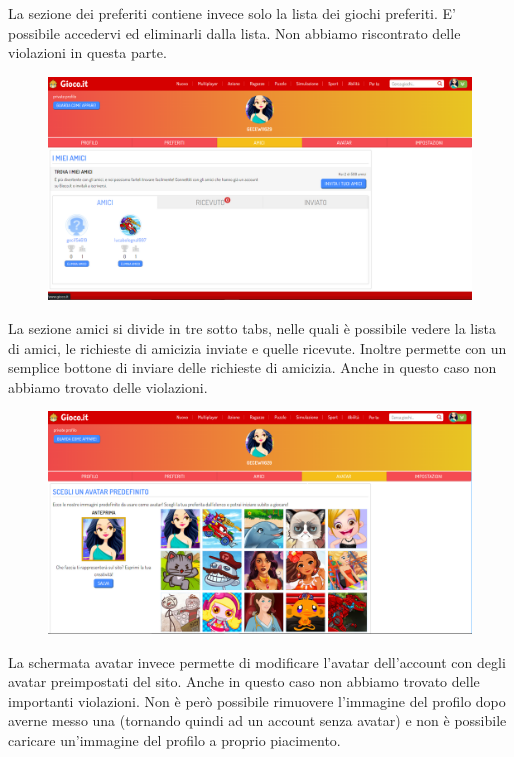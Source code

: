 \documentclass[../Report.tex]{subfiles}
\begin{document}
    La sezione dei preferiti contiene invece solo la lista dei giochi preferiti. E’ possibile accedervi ed eliminarli dalla lista. Non abbiamo riscontrato delle violazioni in questa parte.

    \begin{figure}[H]
        \includegraphics[width=\linewidth]{Assestment15.png}
        \centering
    \end{figure}

    La sezione amici si divide in tre sotto tabs, nelle quali è possibile vedere la lista di amici, le richieste di amicizia inviate e quelle ricevute. Inoltre permette con un semplice bottone di inviare delle richieste di amicizia. Anche in questo caso non abbiamo trovato delle violazioni. 

    \begin{figure}[H]
        \includegraphics[width=\linewidth]{Assestment16.png}
        \centering
    \end{figure}

    La schermata avatar invece permette di modificare l’avatar dell’account con degli avatar preimpostati del sito. Anche in questo caso non abbiamo trovato delle importanti violazioni. Non è però possibile rimuovere l’immagine del profilo dopo averne messo una (tornando quindi ad un account senza avatar) e non è possibile caricare un’immagine del profilo a proprio piacimento. 
\end{document}
